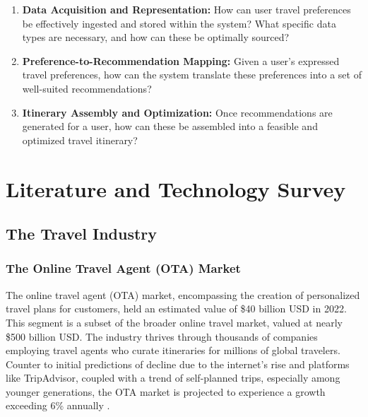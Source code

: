 \documentclass[12pt,a4paper]{report}
\begin{document}
\begin{enumerate}
\item \textbf{Data Acquisition and Representation:} How can user travel preferences be effectively ingested and stored within the system? What specific data types are necessary, and how can these be optimally sourced?

\item \textbf{Preference-to-Recommendation Mapping:} Given a user's expressed travel preferences, how can the system translate these preferences into a set of well-suited recommendations?

\item \textbf{Itinerary Assembly and Optimization:} Once recommendations are generated for a user, how can these be assembled into a feasible and optimized travel itinerary?
\end{enumerate}


\chapter{Literature and Technology Survey}

\section{The Travel Industry}

\subsection{The Online Travel Agent (OTA) Market}

The online travel agent (OTA) market, encompassing the creation of personalized travel plans for customers, held an estimated value of \$40 billion USD in 2022. This segment is a subset of the broader online travel market, valued at nearly \$500 billion USD\citep{statistatraveldata}. The industry thrives through thousands of companies employing travel agents who curate itineraries for millions of global travelers. Counter to initial predictions of decline due to the internet's rise and platforms like TripAdvisor, coupled with a trend of self-planned trips, especially among younger generations, the OTA market is projected to experience a growth exceeding 6\% annually\citep{linkedinota} .
\end{document}
